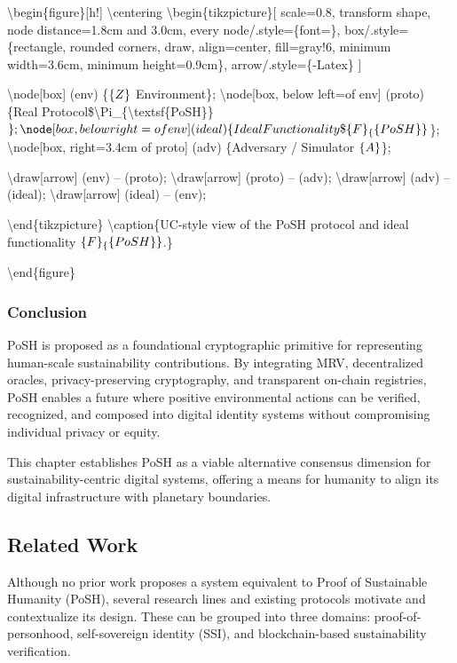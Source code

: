 \documentclass{article}
\begin{document}
{\textbackslash}begin\{figure\}[h!]
{\textbackslash}centering
{\textbackslash}begin\{tikzpicture\}[
scale=0.8,
transform shape,
node distance=1.8cm and 3.0cm,
every node/.style=\{font=\},
box/.style=\{rectangle, rounded corners, draw, align=center, fill=gray!6,
minimum width=3.6cm, minimum height=0.9cm\},
arrow/.style=\{-Latex\}
]

{\textbackslash}node[box] (env) \{$\mathcal\{Z\}$
Environment\};
{\textbackslash}node[box, below left=of env] (proto) \{Real Protocol\${\textbackslash}Pi\_\{{\textbackslash}textsf\{PoSH\}\}$\};
  \node[box, below right=of env] (ideal) \{Ideal Functionality\$\mathcal\{F\}_\{\textsf\{PoSH\}\}$\};
{\textbackslash}node[box, right=3.4cm of proto] (adv) \{Adversary /
Simulator $\mathcal\{A\}$\};

{\textbackslash}draw[arrow] (env) -- (proto);
{\textbackslash}draw[arrow] (proto) -- (adv);
{\textbackslash}draw[arrow] (adv) -- (ideal);
{\textbackslash}draw[arrow] (ideal) -- (env);

{\textbackslash}end\{tikzpicture\}
{\textbackslash}caption\{UC-style view of the PoSH protocol and ideal functionality
$\mathcal\{F\}_\{\textsf\{PoSH\}\}$.\}

{\textbackslash}end\{figure\}

\subsubsection{Conclusion}

PoSH is proposed as a foundational cryptographic primitive for representing
human-scale sustainability contributions. By integrating MRV, decentralized
oracles, privacy-preserving cryptography, and transparent on-chain registries,
PoSH enables a future where positive environmental actions can be verified,
recognized, and composed into digital identity systems without compromising
individual privacy or equity.

This chapter establishes PoSH as a viable alternative consensus dimension for
sustainability-centric digital systems, offering a means for humanity to align
its digital infrastructure with planetary boundaries.

\subsection{Related Work}

Although no prior work proposes a system equivalent to Proof of Sustainable
Humanity (PoSH), several research lines and existing protocols motivate and
contextualize its design. These can be grouped into three domains:
proof-of-personhood, self-sovereign identity (SSI), and blockchain-based
sustainability verification.
\end{document}
